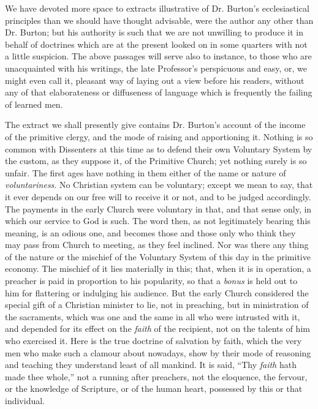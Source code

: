 We have
devoted more space to extracts illustrative of Dr. Burton's
ecclesiastical principles than we should have thought advisable, were
the author any other than Dr. Burton; but his authority is such that we
are not unwilling to produce it in behalf of doctrines which are at the
present looked on in some quarters with not a little suspicion. The
above passages will serve also to instance, to those who are
unacquainted with his writings, the late Professor's perspicuous and
easy, or, we might even call it, pleasant way of laying out a view
before his readers, without any of that elaborateness or diffuseness of
language which is frequently the failing of learned men.

The extract
we shall presently give contains Dr. Burton's account of the income of
the primitive clergy, and the mode of raising and apportioning it.
Nothing is so common with Dissenters at this time as to defend their own
Voluntary System by the custom, as they suppose it, of the Primitive
Church; yet nothing surely is so unfair. The first ages have nothing in
them either of the name or nature of \emph{voluntariness}. No Christian
system can be voluntary; except we mean to say, that it ever depends on
our free will to receive it or not, and to be judged accordingly. The
payments in the early Church were voluntary in that, and that sense
only, in which our service to God is such. The word then, as not
legitimately bearing this meaning, is an odious one, and becomes those
and those only who think they may pass from Church to meeting, as they
feel inclined. Nor was there any thing of the nature or the mischief of
the Voluntary System of this day in the primitive economy. The mischief
of it lies materially in this; that, when it is in operation, a preacher
is paid in proportion to his popularity, so that a \emph{bonus} is held
out to him for flattering or indulging his audience. But the early
Church considered the special gift of a Christian minister to lie, not
in preaching, but in ministration of the sacraments, which was one and
the same in all who were intrusted with it, and depended for its effect
on the \emph{faith} of the recipient, not on the talents of him who
exercised it. Here is the true doctrine of salvation by faith, which the
very men who make such a clamour about nowadays, show by their mode of
reasoning and teaching they understand least of all mankind. It is said,
``Thy \emph{faith} hath made thee whole,'' not a running after
preachers, not the eloquence, the fervour, or the knowledge of
Scripture, or of the human heart, possessed by this or that individual.
